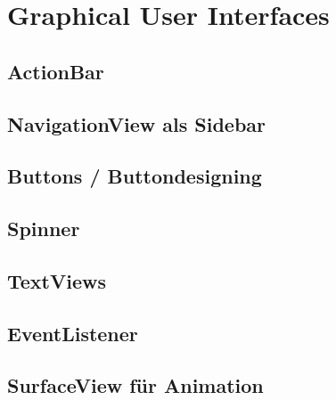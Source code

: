 \chapter{Graphical User Interfaces}

	\section{ActionBar}
	\section{NavigationView als Sidebar}
	\section{Buttons / Buttondesigning}
	\section{Spinner}
	\section{TextViews}
	\section{EventListener}
	\section{SurfaceView für Animation}